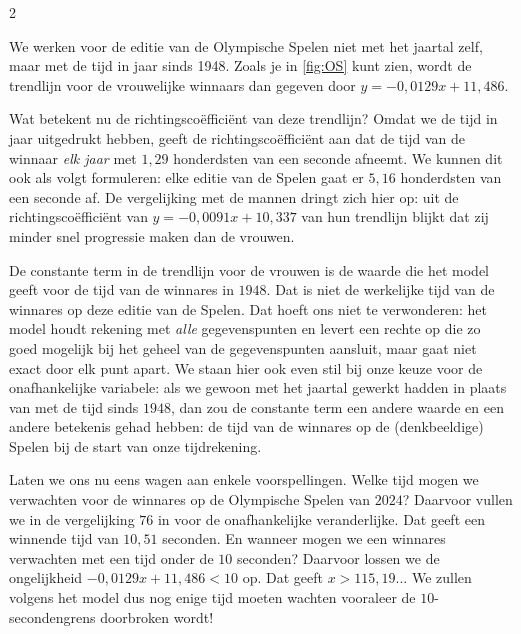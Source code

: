 \bigskip

\bigskip



\begin{multicols}{2}
    
We werken voor de editie van de Olympische Spelen niet met het jaartal zelf, maar met de tijd in jaar sinds 1948. Zoals je in \autoref{fig:OS} kunt zien, wordt de trendlijn voor de vrouwelijke winnaars dan gegeven door $y=-0,0129x+11,486$.


Wat betekent nu de richtingscoëfficiënt van deze trendlijn? Omdat we de tijd in jaar uitgedrukt hebben, geeft de richtingscoëfficiënt aan dat de tijd van de winnaar \emph{elk jaar} met $1,29$ honderdsten van een seconde afneemt. We kunnen dit ook als volgt formuleren: elke editie van de Spelen gaat er $5,16$ honderdsten van een seconde af. De vergelijking met de mannen dringt zich hier op: uit de richtingscoëfficiënt van $y=-0,0091x+10,337$ van hun trendlijn blijkt dat zij minder snel progressie maken dan de vrouwen.

De constante term in de trendlijn voor de vrouwen is de waarde die het model geeft voor de tijd van de winnares in $1948$. Dat is niet de werkelijke tijd van de winnares op deze editie van de Spelen. Dat hoeft ons niet te verwonderen: het model houdt rekening met \emph{alle} gegevenspunten en levert een rechte op die zo goed mogelijk bij het geheel van de gegevenspunten aansluit, maar gaat niet exact door elk punt apart. We staan hier ook even stil bij onze keuze voor de onafhankelijke variabele: als we gewoon met het jaartal gewerkt hadden in plaats van met de tijd sinds $1948$, dan zou de constante term een andere waarde en een andere betekenis gehad hebben: de tijd van de winnares op de (denkbeeldige) Spelen bij de start van onze tijdrekening.

Laten we ons nu eens wagen aan enkele voorspellingen. Welke tijd mogen we verwachten voor de winnares op de Olympische Spelen van $2024$? Daarvoor vullen we in de vergelijking $76$ in voor de onafhankelijke veranderlijke. Dat geeft een winnende tijd van $10,51$ seconden. En wanneer mogen we een winnares verwachten met een tijd onder de $10$ seconden? Daarvoor lossen we de ongelijkheid $-0,0129x+11,486<10$ op. Dat geeft $x>115,19...$ We zullen volgens het model dus nog enige tijd moeten wachten vooraleer de $10$-secondengrens doorbroken wordt!


\end{multicols}
